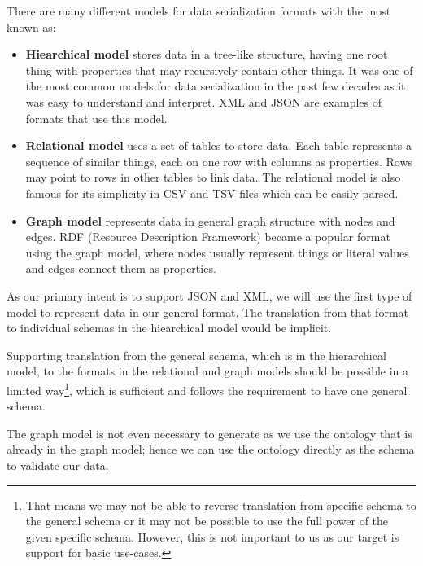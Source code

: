 There are many different models for data serialization formats with the most known as:
\begin{itemize}
    \item \textbf{Hiearchical model} stores data in a tree-like structure, having one root thing with properties that may recursively contain other things. It was one of the most common models for data serialization in the past few decades as it was easy to understand and interpret. XML and JSON are examples of formats that use this model.
    \item \textbf{Relational model} uses a set of tables to store data. Each table represents a sequence of similar things, each on one row with columns as properties. Rows may point to rows in other tables to link data. The relational model is also famous for its simplicity in CSV and TSV files which can be easily parsed.
    \item \textbf{Graph model} represents data in general graph structure with nodes and edges. RDF (Resource Description Framework) became a popular format using the graph model, where nodes usually represent things or literal values and edges connect them as properties.
\end{itemize}


As our primary intent is to support JSON and XML, we will use the first type of model to represent data in our general format. The translation from that format to individual schemas in the hiearchical model would be implicit.

Supporting translation from the general schema, which is in the hierarchical model, to the formats in the relational and graph models should be possible in a limited way\footnote{That means we may not be able to reverse translation from specific schema to the general schema or it may not be possible to use the full power of the given specific schema. However, this is not important to us as our target is support for basic use-cases.}, which is sufficient and follows the requirement to have one general schema.

The graph model is not even necessary to generate as we use the ontology that is already in the graph model; hence we can use the ontology directly as the schema to validate our data.



